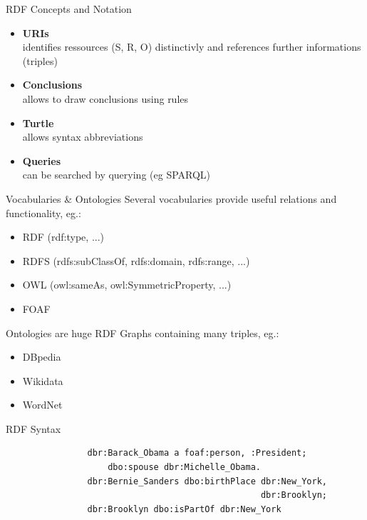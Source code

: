\documentclass[11pt]{beamer}
\begin{document}
		\begin{frame}{RDF Concepts and Notation}
			\begin{itemize}
				\item \textbf{URIs}\\
					identifies ressources (S, R, O) distinctivly and references further informations (triples)
				\item \textbf{Conclusions}\\
					allows to draw conclusions using rules
				\item \textbf{Turtle}\\
					allows syntax abbreviations
				\item \textbf{Queries}\\
					can be searched by querying (eg SPARQL)
				
			\end{itemize}
		\end{frame}
		
		\begin{frame}{Vocabularies \& Ontologies}
			Several vocabularies provide useful relations and functionality, eg.:
			\begin{itemize}
				\item RDF (rdf:type, ...)
				\item RDFS (rdfs:subClassOf, rdfs:domain, rdfs:range, ...)
				\item OWL (owl:sameAs, owl:SymmetricProperty, ...)
				\item FOAF
			\end{itemize}
			
			Ontologies are huge RDF Graphs containing many triples, eg.:
			\begin{itemize}
				\item DBpedia
				\item Wikidata
				\item WordNet
			\end{itemize}						
		\end{frame}
		
		\begin{frame}[fragile]{RDF Syntax}
			\begin{verbatim}
				dbr:Barack_Obama a foaf:person, :President;
				    dbo:spouse dbr:Michelle_Obama.
				dbr:Bernie_Sanders dbo:birthPlace dbr:New_York, 
				                                  dbr:Brooklyn;
				dbr:Brooklyn dbo:isPartOf dbr:New_York 	
			\end{verbatim}
		\end{frame}
		
\end{document}
